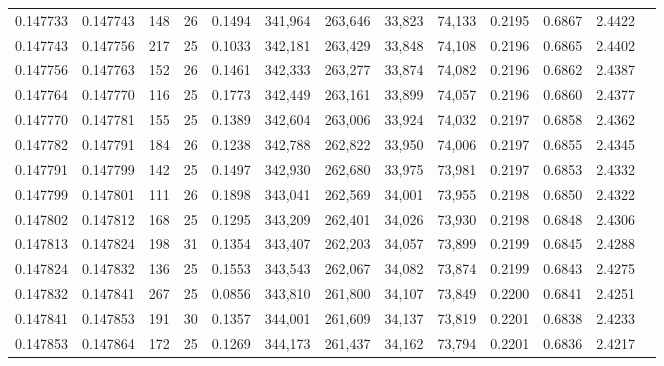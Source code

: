 \begin{tabular}{rrrrrrrrrrrrr}
0.147733 & 0.147743 & 148 &  26 &                                     0.1494 & 341,964 & 263,646 &  33,823 &  74,133 & 0.2195 & 0.6867 & 2.4422 \\
0.147743 & 0.147756 & 217 &  25 &                                     0.1033 & 342,181 & 263,429 &  33,848 &  74,108 & 0.2196 & 0.6865 & 2.4402 \\
0.147756 & 0.147763 & 152 &  26 &                                     0.1461 & 342,333 & 263,277 &  33,874 &  74,082 & 0.2196 & 0.6862 & 2.4387 \\
0.147764 & 0.147770 & 116 &  25 &                                     0.1773 & 342,449 & 263,161 &  33,899 &  74,057 & 0.2196 & 0.6860 & 2.4377 \\
0.147770 & 0.147781 & 155 &  25 &                                     0.1389 & 342,604 & 263,006 &  33,924 &  74,032 & 0.2197 & 0.6858 & 2.4362 \\
0.147782 & 0.147791 & 184 &  26 &                                     0.1238 & 342,788 & 262,822 &  33,950 &  74,006 & 0.2197 & 0.6855 & 2.4345 \\
0.147791 & 0.147799 & 142 &  25 &                                     0.1497 & 342,930 & 262,680 &  33,975 &  73,981 & 0.2197 & 0.6853 & 2.4332 \\
0.147799 & 0.147801 & 111 &  26 &                                     0.1898 & 343,041 & 262,569 &  34,001 &  73,955 & 0.2198 & 0.6850 & 2.4322 \\
0.147802 & 0.147812 & 168 &  25 &                                     0.1295 & 343,209 & 262,401 &  34,026 &  73,930 & 0.2198 & 0.6848 & 2.4306 \\
0.147813 & 0.147824 & 198 &  31 &                                     0.1354 & 343,407 & 262,203 &  34,057 &  73,899 & 0.2199 & 0.6845 & 2.4288 \\
0.147824 & 0.147832 & 136 &  25 &                                     0.1553 & 343,543 & 262,067 &  34,082 &  73,874 & 0.2199 & 0.6843 & 2.4275 \\
0.147832 & 0.147841 & 267 &  25 &                                     0.0856 & 343,810 & 261,800 &  34,107 &  73,849 & 0.2200 & 0.6841 & 2.4251 \\
0.147841 & 0.147853 & 191 &  30 &                                     0.1357 & 344,001 & 261,609 &  34,137 &  73,819 & 0.2201 & 0.6838 & 2.4233 \\
0.147853 & 0.147864 & 172 &  25 &                                     0.1269 & 344,173 & 261,437 &  34,162 &  73,794 & 0.2201 & 0.6836 & 2.4217 \\

\end{tabular}
